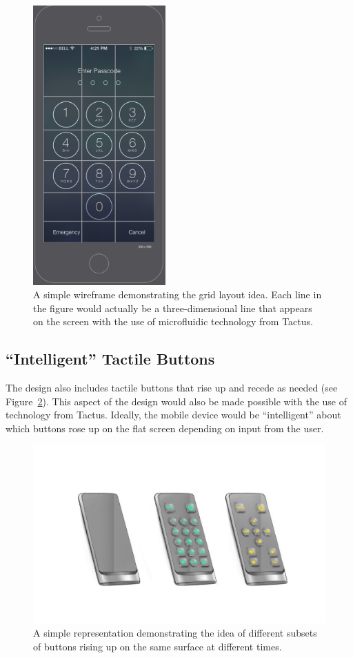 \documentclass[11pt]{article}
\begin{document}
\begin{figure}[ht]
\centering
\includegraphics[width=2in]{wireframe-grid.png} 
\caption{A simple wireframe demonstrating the grid layout idea. Each line in the figure would actually be a three-dimensional line that appears on the screen with the use of microfluidic technology from Tactus.}
\label{wireframe-grid}
\end{figure}

\subsection{``Intelligent'' Tactile Buttons}
The design also includes tactile buttons that rise up and recede as needed (see Figure~\ref{buttons}). This aspect of the design would also be made possible with the use of technology from Tactus. Ideally, the mobile device would be ``intelligent'' about which buttons rose up on the flat screen depending on input from the user.
 
\begin{figure}[ht]
\centering
\includegraphics[width=6in]{buttons.jpg}
\caption{A simple representation demonstrating the idea of different subsets of buttons rising up on the same surface at different times.}
\label{buttons}
\end{figure}
\end{document}
